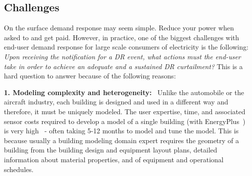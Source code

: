 \subsection{Challenges}

On the surface demand response may seem simple. Reduce your power when asked to and get paid. 
However, in practice, one of the biggest challenges with end-user demand response for large scale consumers of electricity is the following: \emph{Upon receiving the notification for a DR event, what actions must the end-user take in order to achieve an adequate and a sustained DR curtailment?} 
This is a hard question to answer because of the following reasons:\vspace{4pt}

\textbf{1. Modeling complexity and heterogeneity:}
~Unlike the automobile or the aircraft industry, each building is designed and used in a different way and therefore, it must be uniquely modeled. 
The user expertise, time, and associated sensor costs required to develop a model of a single building (\eg with EnergyPlus~\cite{Crawley2001319}) is very high~\cite{sturzeneggermodel} - often taking 5-12 months to model and tune the model.
This is because usually a building modeling domain expert requires the geometry of a building from the building design and equipment layout plans, detailed information about material properties, and of  equipment and operational schedules. \vspace{4pt}

